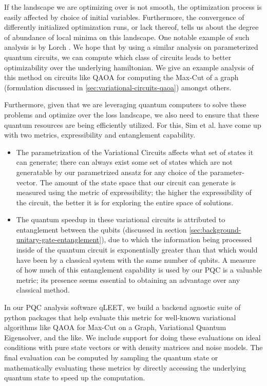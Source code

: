 If the landscape we are optimizing over is not smooth, the optimization process is easily affected by choice of initial variables. Furthermore, the convergence of differently initialized optimization runs, or lack thereof, tells us about the degree of abundance of local minima on this landscape. One notable example of such analysis is by Lorch \cite{training-trajectories}. We hope that by using a similar analysis on parameterized quantum circuits, we can compute which class of circuits leads to better optimizability over the underlying hamiltonian. We give an example analysis of this method on circuits like QAOA for computing the Max-Cut of a graph (formulation discussed in \ref{sec:variational-circuits-qaoa}) amongst others.

Furthermore, given that we are leveraging quantum computers to solve these problems and optimize over the loss landscape, we also need to ensure that these quantum resources are being efficiently utilized. For this, Sim et al. \cite{expressibility-entanglability-guzik} have come up with two metrics, expressibility and entanglement capability. 
\begin{itemize}
    \item The parametrization of the Variational Circuits affects what set of states it can generate; there can always exist some set of states which are not generatable by our parametrized ansatz for any choice of the parameter-vector. The amount of the state space that our circuit can generate is measured using the metric of expressibility; the higher the expressibility of the circuit, the better it is for exploring the entire space of solutions.  
    \item The quantum speedup in these variational circuits is attributed to entanglement between the qubits (discussed in section \ref{sec:background-unitary-gate-entanglement}), due to which the information being processed inside of the quantum circuit is exponentially greater than that which would have been by a classical system with the same number of qubits. A measure of how much of this entanglement capability is used by our PQC is a valuable metric; its presence seems essential to obtaining an advantage over any classical method.
\end{itemize}

In our PQC analysis software qLEET, we build a backend agnostic suite of python packages that help evaluate this metric for well-known variational algorithms like QAOA for Max-Cut on a Graph, Variational Quantum Eigensolver, and the like. We include support for doing these evaluations on ideal conditions with pure state vectors or with density matrices and noise models. The final evaluation can be computed by sampling the quantum state or mathematically evaluating these metrics by directly accessing the underlying quantum state to speed up the computation.

